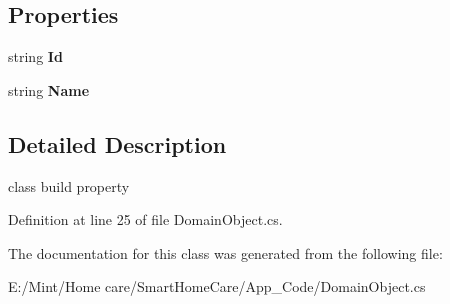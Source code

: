 \subsection*{Properties}
\begin{DoxyCompactItemize}
\item 
\hypertarget{class_domain_object_aa3473b6ae65e61a547cdb676292e2786}{string {\bfseries Id}}\label{class_domain_object_aa3473b6ae65e61a547cdb676292e2786}

\item 
\hypertarget{class_domain_object_a7e4a42db710b65918ff7937f8ed6f3f4}{string {\bfseries Name}}\label{class_domain_object_a7e4a42db710b65918ff7937f8ed6f3f4}

\end{DoxyCompactItemize}


\subsection{Detailed Description}
class build property 

Definition at line 25 of file Domain\-Object.\-cs.



The documentation for this class was generated from the following file\-:\begin{DoxyCompactItemize}
\item 
E\-:/\-Mint/\-Home care/\-Smart\-Home\-Care/\-App\-\_\-\-Code/Domain\-Object.\-cs\end{DoxyCompactItemize}
